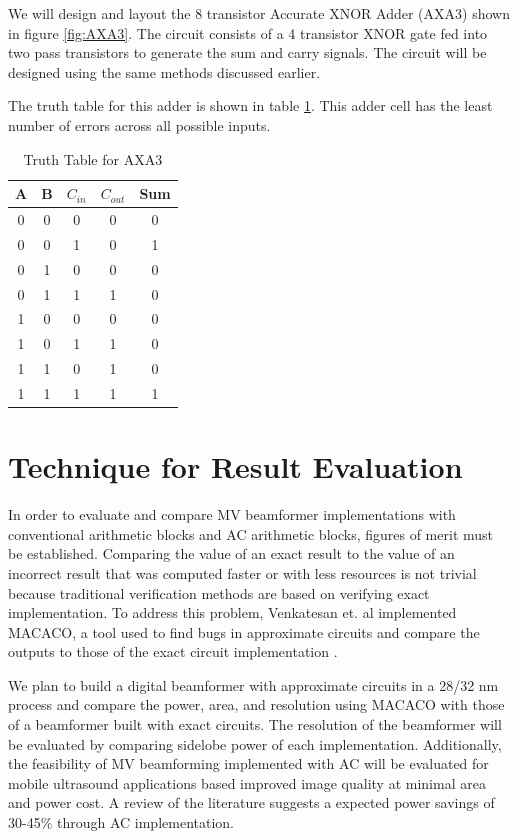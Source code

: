 \documentclass[journal]{IEEEtran}
\begin{document}
We will design and layout the 8 transistor Accurate XNOR Adder (AXA3) shown in figure \ref{fig:AXA3}. The circuit consists of a 4 transistor XNOR gate fed into two pass transistors to generate the sum and carry signals. The circuit will be designed using the same methods discussed earlier.

The truth table for this adder is shown in table \ref{tab:AXA3_Truth}. This adder cell has the least number of errors across all possible inputs.

\begin{table}
    \centering
    \begin{tabular}{c c c | c | c}
         A & B & $C_{in}$ & $C_{out}$ & Sum \\ \hline
         0 & 0 & 0 & 0 & 0 \\ 
         0 & 0 & 1 & 0 & 1 \\ 
         0 & 1 & 0 & 0 & \cellcolor{red!25}0 \\ 
         0 & 1 & 1 & 1 & 0 \\ 
         1 & 0 & 0 & 0 & \cellcolor{red!25}0 \\ 
         1 & 0 & 1 & 1 & 0 \\ 
         1 & 1 & 0 & 1 & 0 \\ 
         1 & 1 & 1 & 1 & 1 \\ 
    \end{tabular}
    
    \caption{Truth Table for AXA3}
    \label{tab:AXA3_Truth}
\end{table}

    

\section{Technique for Result Evaluation}

In order to evaluate and compare MV beamformer implementations with conventional arithmetic blocks and AC arithmetic blocks, figures of merit must be established. 
Comparing the value of an exact result to the value of an incorrect result that was computed faster or with less resources is not trivial because traditional verification methods are based on verifying exact implementation. To address this problem, Venkatesan et. al implemented MACACO, a tool used to find bugs in approximate circuits and compare the outputs to those of the exact circuit implementation \cite{venkatesan2011macaco}. 

We plan to build a digital beamformer with approximate circuits in a 28/32 \si{\nano\meter} process and compare the power, area, and resolution using MACACO with those of a beamformer built with exact circuits. The resolution of the beamformer will be evaluated by comparing sidelobe power of each implementation. Additionally, the feasibility of MV beamforming implemented with AC will be evaluated for mobile ultrasound applications based improved image quality at minimal area and power cost. A review of the literature suggests a expected power savings of 30-45\% through AC implementation.
\end{document}
